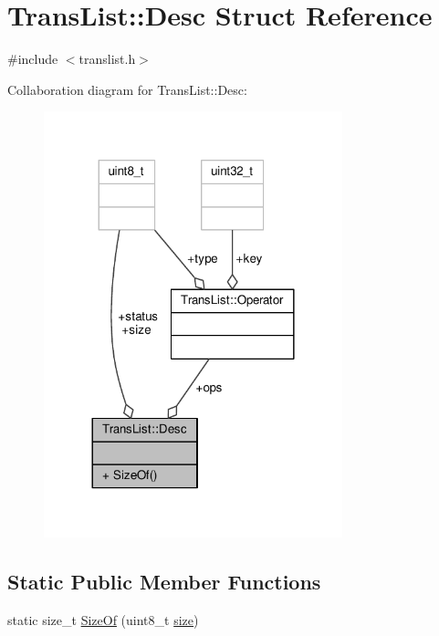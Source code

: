 \hypertarget{structTransList_1_1Desc}{\section{Trans\-List\-:\-:Desc Struct Reference}
\label{structTransList_1_1Desc}
}


{\ttfamily \#include $<$translist.\-h$>$}



Collaboration diagram for Trans\-List\-:\-:Desc\-:
\nopagebreak
\begin{figure}[H]
\begin{center}
\leavevmode
\includegraphics[width=245pt]{structTransList_1_1Desc__coll__graph}
\end{center}
\end{figure}
\subsection*{Static Public Member Functions}
\begin{DoxyCompactItemize}
\item 
static size\-\_\-t \hyperlink{structTransList_1_1Desc_a00906b88913592e5bc51b147d33531de}{Size\-Of} (uint8\-\_\-t \hyperlink{structTransList_1_1Desc_a3c4b261c8c0020499f46a2f7b04a6c0c}{size})
\end{DoxyCompactItemize}
